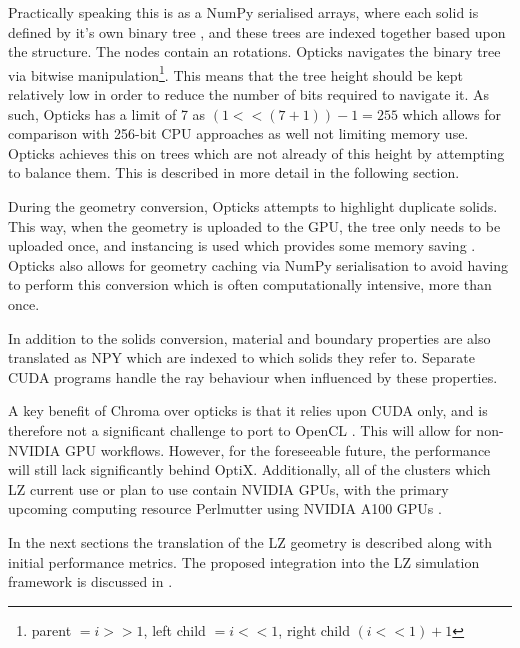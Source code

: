 Practically speaking this is as a NumPy serialised arrays, where each solid is defined by it's own binary tree \cite{Opticks_Paper_2017_ref}, and these trees are indexed together based upon the structure.
The nodes contain an rotations.
Opticks navigates the binary tree via bitwise manipulation\footnote{parent $=i >> 1$, left child $= i << 1$, right child $(i<<1)+1$}.
This means that the tree height should be kept relatively low in order to reduce the number of bits required to navigate it.
As such, Opticks has a limit of 7 as $(1 << (7 + 1)) - 1 = 255$ which allows for comparison with 256-bit CPU approaches as well not limiting memory use.
Opticks achieves this on trees which are not already of this height by attempting to balance them.
This is described in more detail in the following section.
\par
During the geometry conversion, Opticks attempts to highlight duplicate solids.
This way, when the geometry is uploaded to the GPU, the tree only needs to be uploaded once, and instancing is used which provides some memory saving \cite{Opticks_CHEP_2019_ref}.
Opticks also allows for geometry caching via NumPy serialisation \cite{Opticks_Paper_2017_ref} to avoid having to perform this conversion which is often computationally intensive, more than once.
\par
In addition to the solids conversion, material and boundary properties are also translated as NPY which are indexed to which solids they refer to.
Separate CUDA programs handle the ray behaviour when influenced by these properties.
\par
A key benefit of Chroma over opticks is that it relies upon CUDA only, and is therefore not a significant challenge to port to OpenCL \cite{chroma_whitepaper_ref}.
This will allow for non-NVIDIA GPU workflows.
However, for the foreseeable future, the performance will still lack significantly behind OptiX.
Additionally, all of the clusters which LZ current use or plan to use contain NVIDIA GPUs, with the primary upcoming computing resource Perlmutter using NVIDIA A100 GPUs \cite{perlmutter_ref}.
\par
In the next sections the translation of the LZ geometry is described along with initial performance metrics.
The proposed integration into the LZ simulation framework is discussed in \cite{SEriksen_Opticks_CHEP_2021_ref}.


